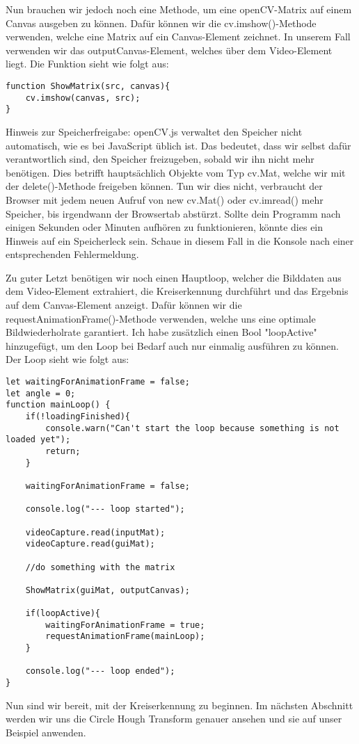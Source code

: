 Nun brauchen wir jedoch noch eine Methode, um eine openCV-Matrix auf einem Canvas ausgeben zu können. Dafür können wir die cv.imshow()-Methode verwenden, welche eine Matrix auf ein Canvas-Element zeichnet. In unserem Fall verwenden wir das outputCanvas-Element, welches über dem Video-Element liegt. Die Funktion sieht wie folgt aus:

\begin{lstlisting}[style=JavaScript]
function ShowMatrix(src, canvas){
    cv.imshow(canvas, src);
}
\end{lstlisting}

Hinweis zur Speicherfreigabe: openCV.js verwaltet den Speicher nicht automatisch, wie es bei JavaScript üblich ist. Das bedeutet, dass wir selbst dafür verantwortlich sind, den Speicher freizugeben, sobald wir ihn nicht mehr benötigen. Dies betrifft hauptsächlich Objekte vom Typ cv.Mat, welche wir mit der delete()-Methode freigeben können. Tun wir dies nicht, verbraucht der Browser mit jedem neuen Aufruf von new cv.Mat() oder cv.imread() mehr Speicher, bis irgendwann der Browsertab abstürzt. Sollte dein Programm nach einigen Sekunden oder Minuten aufhören zu funktionieren, könnte dies ein Hinweis auf ein Speicherleck sein. Schaue in diesem Fall in die Konsole nach einer entsprechenden Fehlermeldung.

Zu guter Letzt benötigen wir noch einen Hauptloop, welcher die Bilddaten aus dem Video-Element extrahiert, die Kreiserkennung durchführt und das Ergebnis auf dem Canvas-Element anzeigt. Dafür können wir die requestAnimationFrame()-Methode verwenden, welche uns eine optimale Bildwiederholrate garantiert. Ich habe zusätzlich einen Bool "loopActive" hinzugefügt, um den Loop bei Bedarf auch nur einmalig ausführen zu können. Der Loop sieht wie folgt aus:

\begin{lstlisting}[style=JavaScript]
let waitingForAnimationFrame = false;
let angle = 0;
function mainLoop() {
    if(!loadingFinished){
        console.warn("Can't start the loop because something is not loaded yet");
        return;
    }

    waitingForAnimationFrame = false;

    console.log("--- loop started");

    videoCapture.read(inputMat);
    videoCapture.read(guiMat);

    //do something with the matrix
    
    ShowMatrix(guiMat, outputCanvas);

    if(loopActive){
        waitingForAnimationFrame = true;
        requestAnimationFrame(mainLoop);
    }

    console.log("--- loop ended");
}
\end{lstlisting}

Nun sind wir bereit, mit der Kreiserkennung zu beginnen. Im nächsten Abschnitt werden wir uns die Circle Hough Transform genauer ansehen und sie auf unser Beispiel anwenden.
